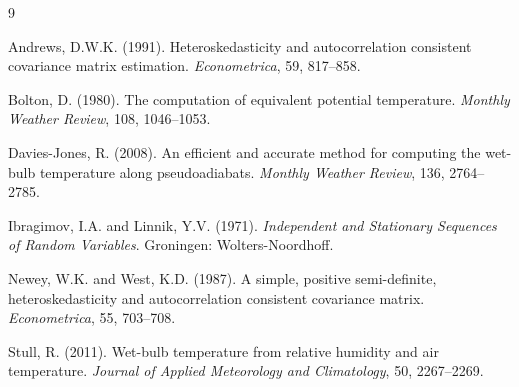 \documentclass[namedate,webpdf,modern,mediumone]{oup-authoring-template}
\theoremstyle{thmstyleone}
\begin{document}
\begin{thebibliography}{9}

Andrews, D.W.K. (1991). Heteroskedasticity and autocorrelation consistent
covariance matrix estimation. \textit{Econometrica}, 59, 817--858.

Bolton, D. (1980). The computation of equivalent potential temperature.
\textit{Monthly Weather Review}, 108, 1046--1053.


Davies-Jones, R. (2008). An efficient and accurate method for computing the
wet-bulb temperature along pseudoadiabats. \textit{Monthly Weather Review},
136, 2764--2785.


Ibragimov, I.A. and Linnik, Y.V. (1971). \textit{Independent and Stationary
Sequences of Random Variables}. Groningen: Wolters-Noordhoff.

Newey, W.K. and West, K.D. (1987). A simple, positive semi-definite,
heteroskedasticity and autocorrelation consistent covariance matrix.
\textit{Econometrica}, 55, 703--708.

Stull, R. (2011). Wet-bulb temperature from relative humidity and air
temperature. \textit{Journal of Applied Meteorology and Climatology}, 50,
2267--2269.


\end{thebibliography}
\end{document}
